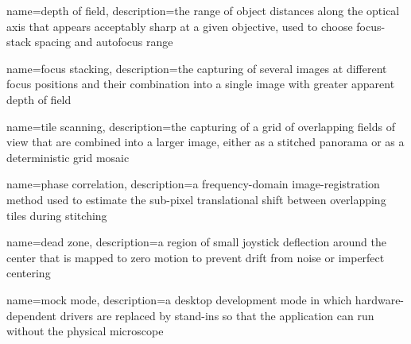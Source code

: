 {
    name={depth of field},
    description={the range of object distances along the optical axis that appears acceptably sharp at a given objective, used to choose focus-stack spacing and autofocus range}
}

{
    name={focus stacking},
    description={the capturing of several images at different focus positions and their combination into a single image with greater apparent depth of field}
}

{
    name={tile scanning},
    description={the capturing of a grid of overlapping fields of view that are combined into a larger image, either as a stitched panorama or as a deterministic grid mosaic}
}

{
    name={phase correlation},
    description={a frequency-domain image-registration method used to estimate the sub-pixel translational shift between overlapping tiles during stitching}
}

{
    name={dead zone},
    description={a region of small joystick deflection around the center that is mapped to zero motion to prevent drift from noise or imperfect centering}
}

{
    name={mock mode},
    description={a desktop development mode in which hardware-dependent drivers are replaced by stand-ins so that the application can run without the physical microscope}
}
